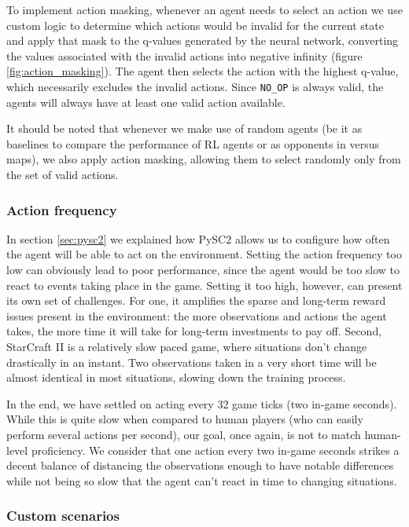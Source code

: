 To implement action masking, whenever an agent needs to select an action we use custom logic to determine which actions would be invalid for the current state and apply that mask to the q-values generated by the neural network, converting the values associated with the invalid actions into negative infinity (figure \ref{fig:action_masking}). The agent then selects the action with the highest q-value, which necessarily excludes the invalid actions. Since \texttt{NO\_OP} is always valid, the agents will always have at least one valid action available.

It should be noted that whenever we make use of random agents (be it as baselines to compare the performance of RL agents or as opponents in versus maps), we also apply action masking, allowing them to select randomly only from the set of valid actions.

\subsubsection*{Action frequency}

In section \ref{sec:pysc2} we explained how PySC2 allows us to configure how often the agent will be able to act on the environment. Setting the action frequency too low can obviously lead to poor performance, since the agent would be too slow to react to events taking place in the game. Setting it too high, however, can present its own set of challenges. For one, it amplifies the sparse and long-term reward issues present in the environment: the more observations and actions the agent takes, the more  time it will take for long-term investments to pay off. Second, StarCraft II is a relatively slow paced game, where situations don't change drastically in an instant. Two observations taken in a very short time will be almost identical in most situations, slowing down the training process.

In the end, we have settled on acting every 32 game ticks (two in-game seconds). While this is quite slow when compared to human players (who can easily perform several actions per second), our goal, once again, is not to match human-level proficiency. We consider that one action every two in-game seconds strikes a decent balance of distancing the observations enough to have notable differences while not being so slow that the agent can't react in time to changing situations.

\subsubsection*{Custom scenarios}

